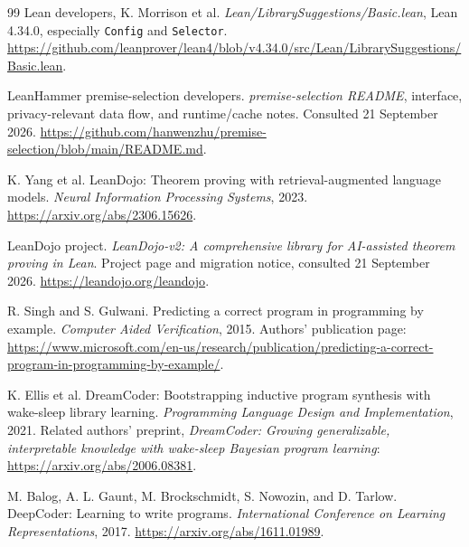 \documentclass[11pt,a4paper]{article}
\newcommand{\code}[1]{\nolinkurl{#1}}
\theoremstyle{remark}
\begin{document}
\begin{thebibliography}{99}
 Lean developers, K. Morrison et al.
\emph{Lean/LibrarySuggestions/Basic.lean}, Lean 4.34.0, especially \code{Config} and \code{Selector}.
\url{https://github.com/leanprover/lean4/blob/v4.34.0/src/Lean/LibrarySuggestions/Basic.lean}.

 LeanHammer premise-selection developers.
\emph{premise-selection README}, interface, privacy-relevant data flow, and runtime/cache notes. Consulted 21 September 2026.
\url{https://github.com/hanwenzhu/premise-selection/blob/main/README.md}.

 K. Yang et al.
LeanDojo: Theorem proving with retrieval-augmented language models.
\emph{Neural Information Processing Systems}, 2023.
\url{https://arxiv.org/abs/2306.15626}.

 LeanDojo project.
\emph{LeanDojo-v2: A comprehensive library for AI-assisted theorem proving in Lean}. Project page and migration notice, consulted 21 September 2026.
\url{https://leandojo.org/leandojo}.

 R. Singh and S. Gulwani.
Predicting a correct program in programming by example.
\emph{Computer Aided Verification}, 2015. Authors' publication page:
\url{https://www.microsoft.com/en-us/research/publication/predicting-a-correct-program-in-programming-by-example/}.

 K. Ellis et al.
DreamCoder: Bootstrapping inductive program synthesis with wake-sleep library learning.
\emph{Programming Language Design and Implementation}, 2021.
Related authors' preprint, \emph{DreamCoder: Growing generalizable, interpretable knowledge with wake-sleep Bayesian program learning}:
\url{https://arxiv.org/abs/2006.08381}.

 M. Balog, A. L. Gaunt, M. Brockschmidt, S. Nowozin, and D. Tarlow.
DeepCoder: Learning to write programs.
\emph{International Conference on Learning Representations}, 2017.
\url{https://arxiv.org/abs/1611.01989}.

\end{thebibliography}
\end{document}
